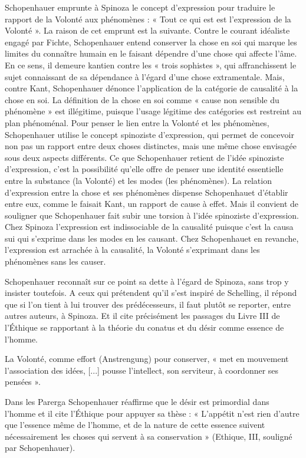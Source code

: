 Schopenhauer emprunte à Spinoza le concept d’expression pour traduire le rapport de la Volonté aux
phénomènes : « Tout ce qui est est l’expression de la Volonté ». La raison de cet emprunt
est la suivante. Contre le courant idéaliste engagé par Fichte, Schopenhauer entend conserver la chose en soi
qui marque les limites du connaître humain en le faisant dépendre d’une chose qui affecte l’âme. En ce sens,
il demeure kantien contre les « trois sophistes », qui affranchissent le sujet connaissant de sa dépendance à
l’égard d’une chose extramentale. Mais, contre Kant, Schopenhauer dénonce l’application de la catégorie de
causalité à la chose en soi. La définition de la chose en soi comme « cause non sensible du phénomène »
est illégitime, puisque l’usage légitime des catégories est restreint au plan phénoménal.
Pour penser le lien entre la Volonté et les phénomènes, Schopenhauer utilise le concept
spinoziste d’expression, qui permet de concevoir non pas un rapport entre deux choses distinctes, mais une
même chose envisagée sous deux aspects différents. Ce que Schopenhauer retient de l’idée spinoziste
d’expression, c’est la possibilité qu’elle offre de penser une identité essentielle entre la substance (la Volonté)
et les modes (les phénomènes). La relation d’expression entre la chose et ses phénomènes dispense
Schopenhauet d’établir entre eux, comme le faisait Kant, un rapport de cause à effet. Mais il convient de
souligner que Schopenhauer fait subir une torsion à l’idée spinoziste d’expression. Chez Spinoza
l’expression est indissociable de la causalité puisque c’est la causa sui qui s’exprime dans les modes en les
causant. Chez Schopenhauet en revanche, l’expression est arrachée à la causalité, la Volonté s’exprimant
dans les phénomènes sans les causer.

Schopenhauer reconnaît sur ce point sa dette à l’égard de Spinoza, sans trop y insister toutefois. A ceux
qui prétendent qu’il s’est inspiré de Schelling, il répond que si l’on tient à lui trouver des prédécesseurs, il
faut plutôt se reporter, entre autres auteurs, à Spinoza. Et il cite précisément les passages du Livre III de
l’Éthique se rapportant à la théorie du conatus et du désir comme essence de l’homme.

La Volonté, comme effort (Anstrengung) pour conserver, « met en mouvement l’association des idées, [...]
pousse l’intellect, son serviteur, à coordonner ses pensées ».

Dans les Parerga  Schopenhauer réaffirme que le désir est primordial dans l’homme et il
cite l’Éthique pour appuyer sa thèse : « L’appétit n’est rien d’autre que l’essence même de l’homme, et de la
nature de cette essence suivent nécessairement les choses qui servent à sa conservation » (Ethique, III, souligné par Schopenhauer).

